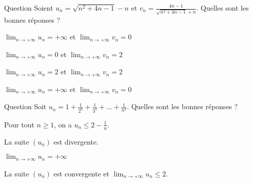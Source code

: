 \begin{multi}[multiple,feedback=
{On multiplie par le terme conjugué, on obtient \(\displaystyle u_n=\frac{4n-1}{\sqrt{n^2+4n-1}+n}=v_n\). Ensuite,
\[\frac{4n-1}{\sqrt{n^2+4n-1}+n}=\frac{4n\left(1-\frac{1}{4n}\right)}{n\left(\sqrt{1+\frac{4}{n}-\frac{1}{n^2}}+1\right)}=4\frac{1-\frac{1}{4n}}{\sqrt{1+\frac{4}{n}-\frac{1}{n^2}}+1}\underset{+\infty}{\longrightarrow}2.\]
}]{Question}
Soient \(\displaystyle u_n=\sqrt{n^2+4n-1}-n\) et \(\displaystyle v_n=\frac{4n-1}{\sqrt{n^2+4n-1}+n}\). Quelles sont les bonnes réponses ?

    \item \(\displaystyle \lim _{n\to +\infty}u_n=+\infty\) et \(\displaystyle \lim _{n\to +\infty}v_n=0\)
    \item \(\displaystyle \lim _{n\to +\infty}u_n=0\) et \(\displaystyle \lim _{n\to +\infty}v_n=2\)
    \item* \(\displaystyle \lim _{n\to +\infty}u_n=2\) et \(\displaystyle \lim _{n\to +\infty}v_n=2\)
    \item \(\displaystyle \lim _{n\to +\infty}u_n=+\infty\) et \(\displaystyle \lim _{n\to +\infty}v_n=0\)
\end{multi}


\begin{multi}[multiple,feedback=
{On vérifie par récurrence que \(\displaystyle u_n\leq 2-\frac{1}{n}\), donc \((u_n)\) est majorée par \(2\). Par ailleurs, il est clair que \((u_n)\) est croissante. Le théorème des suites monotones implique que \((u_n)\) est convergente et que \(\displaystyle \lim _{n\to +\infty}u_n\leq 2\).
}]{Question}
Soit \(\displaystyle u_n=1+\frac{1}{2^2}+\frac{1}{3^2}+\dots +\frac{1}{n^2}\). Quelles sont les bonnes réponses ?

    \item* Pour tout \(n\geq 1\), on a \(\displaystyle u_n\leq 2-\frac{1}{n}\).
    \item La suite \((u_n)\) est divergente.
    \item \(\displaystyle \lim _{n\to +\infty}u_n=+\infty\)
    \item* La suite \((u_n)\) est convergente et \(\displaystyle \lim _{n\to +\infty}u_n\leq 2\).
\end{multi}


